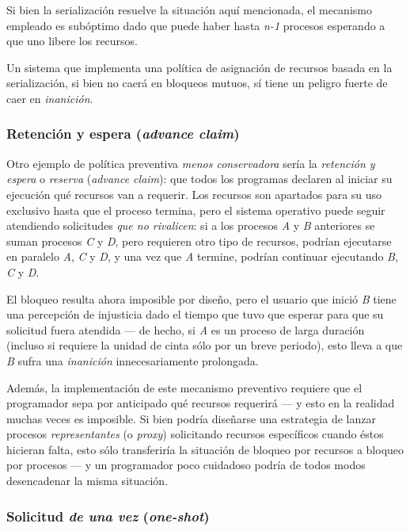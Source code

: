 \documentclass[11pt,fleqn]{book} %
\begin{document}
Si bien la serialización resuelve la situación aquí mencionada, el
mecanismo empleado es subóptimo dado que puede haber hasta \emph{n-1}
procesos esperando a que uno libere los recursos.

Un sistema que implementa una política de asignación de recursos
basada en la serialización, si bien no caerá en bloqueos mutuos, sí
tiene un peligro fuerte de caer en \emph{inanición}.
\subsubsection{Retención y espera (\emph{advance claim})}
\label{sec-3-4-1-2}


Otro ejemplo de política preventiva \emph{menos conservadora} sería la
\emph{retención y espera} o \emph{reserva} (\emph{advance claim}): que todos los
programas declaren al iniciar su ejecución qué recursos van a
requerir. Los recursos son apartados para su uso exclusivo hasta que
el proceso termina, pero el sistema operativo puede seguir atendiendo
solicitudes \emph{que no rivalicen}: si a los procesos \emph{A} y \emph{B} anteriores
se suman procesos \emph{C} y \emph{D}, pero requieren otro tipo de recursos,
podrían ejecutarse en paralelo \emph{A}, \emph{C} y \emph{D}, y una vez que \emph{A}
termine, podrían continuar ejecutando \emph{B}, \emph{C} y \emph{D}.

El bloqueo resulta ahora imposible por diseño, pero el usuario que
inició \emph{B} tiene una percepción de injusticia dado el tiempo que tuvo
que esperar para que su solicitud fuera atendida — de hecho, si \emph{A} es
un proceso de larga duración (incluso si requiere la unidad de cinta
sólo por un breve periodo), esto lleva a que \emph{B} sufra una \emph{inanición}
innecesariamente prolongada.

Además, la implementación de este mecanismo preventivo requiere que el
programador sepa por anticipado qué recursos requerirá — y esto en la
realidad muchas veces es imposible. Si bien podría diseñarse una
estrategia de lanzar procesos \emph{representantes} (o \emph{proxy}) solicitando
recursos específicos cuando éstos hicieran falta, esto sólo
transferiría la situación de bloqueo por recursos a bloqueo por
procesos — y un programador poco cuidadoso podría de todos modos
desencadenar la misma situación.
\subsubsection{Solicitud \emph{de una vez} (\emph{one-shot})}
\label{sec-3-4-1-3}
\label{PROC_one-shot}
\end{document}
